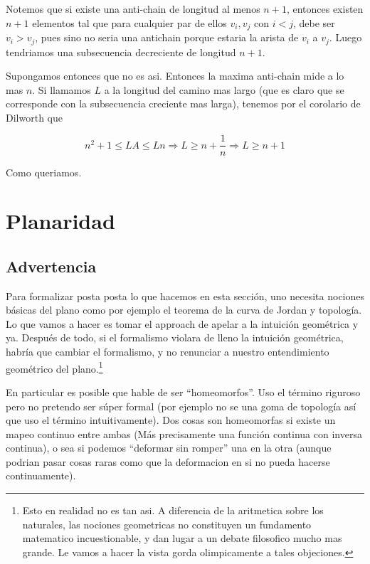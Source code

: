 \documentclass{article}
\begin{document}
Notemos que si existe una anti-chain de longitud al menos $n+1$, entonces existen $n+1$ elementos tal que para cualquier par de ellos $v_i,v_j$ con
$i<j$, debe ser $v_i > v_j$, pues sino no seria una antichain porque estaria la arista de $v_i$ a $v_j$. Luego tendriamos una subsecuencia
decreciente de longitud $n+1$.

Supongamos entonces que no es asi. Entonces la maxima anti-chain mide a lo mas $n$. Si llamamos $L$ a la longitud del camino mas largo
(que es claro que se corresponde con la subsecuencia creciente mas larga), tenemos por el corolario de Dilworth que

$$n^2+1 \leq LA \leq Ln \Rightarrow L \geq n + \frac{1}{n} \Rightarrow L \geq n+1$$

Como queriamos.

\pagebreak

\section{Planaridad}

\subsection{Advertencia}

Para formalizar posta posta lo que hacemos en esta sección, uno necesita nociones básicas del plano como por ejemplo el teorema de la curva de Jordan
y topología. Lo que vamos a hacer es tomar el approach de apelar a la intuición geométrica y ya. Después de todo, si el formalismo violara de
lleno la intuición geométrica, habría que cambiar el formalismo, y no renunciar a nuestro entendimiento geométrico del plano.\footnote{Esto en realidad no es tan asi. A diferencia de la aritmetica sobre los naturales, las nociones geometricas no constituyen un fundamento
matematico incuestionable, y dan lugar a un debate filosofico mucho mas grande. Le vamos a hacer la vista gorda olimpicamente a tales objeciones.}

En particular es posible que hable de ser ``homeomorfos''. Uso el término riguroso pero no pretendo ser súper formal (por ejemplo no se una
goma de topología así que uso el término intuitivamente). Dos cosas son homeomorfas si existe un mapeo continuo entre ambas (Más precisamente
una función continua con inversa continua), o sea si podemos ``deformar sin romper'' una en la otra (aunque podrian pasar cosas raras como
que la deformacion en si no pueda hacerse continuamente).
\end{document}
